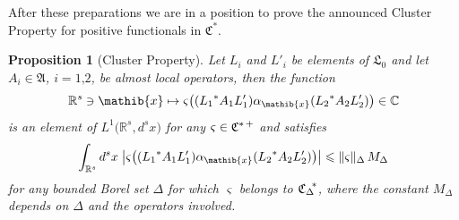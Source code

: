 \documentclass[11pt,twoside,openright]{report}
\theoremstyle{definition}
\theoremstyle{plain}
\newtheorem{Pro}[Def]{Proposition}
\theoremstyle{remark}
\theoremstyle{assumption}
\newcommand{\babs}[1]{\bigl\lvert #1 \bigr\rvert}
\newcommand{\norm}[1]{\lVert #1 \rVert}
\newcommand{\Cbb}{\mathbb{C}}
\newcommand{\Afrak}{\mathfrak{A}}
\newcommand{\Lfrak}{\mathfrak{L}}
\newcommand{\xib}{\mathib{x}}
\newcommand{\Rs}{\mathbb{R}^s}
\newcommand{\Cstar}{\mathfrak{C}^*}
\newcommand{\Cstarplus}{\mathfrak{C}^{* \thinspace +}}
\newcommand{\CDstar}{{\mathfrak{C}_\Delta}^{\negthickspace *}}
\newcommand{\aibx}{\alpha_\mathib{x}}
\begin{document}
After these preparations we are in a position to prove the announced
Cluster Property for positive functionals in $\Cstar$.
\begin{Pro}[Cluster Property]
  \label{Pro-cluster}
  Let $L_i$ and $L'_i$ be elements of $\Lfrak_0$ and let $A_i \in
  \Afrak$, $i = 1 \text{,} 2$, be almost local operators, then the
  function
  \begin{equation*}
    \Rs \ni \xib \mapsto \varsigma \bigl( ( {L_1}^* A_1 L'_1 ) \aibx (
    {L_2}^* A_2 L'_2 ) \bigr) \in \Cbb
  \end{equation*}
  is an element of $L^1 \bigl( \Rs , d^s x \bigr)$ for any $\varsigma
  \in \Cstarplus$ and satisfies
  \begin{equation}
    \label{eq-cluster}
    \int_{\Rs} d^s x \; \babs{\varsigma \bigl( ( {L_1}^* A_1 L'_1 )
    \aibx ( {L_2}^* A_2 L'_2 ) \bigr)} \leqslant
    \norm{\varsigma}_\Delta \, M_\Delta
  \end{equation}
  for any bounded Borel set $\Delta$ for which $\varsigma$ belongs to
  $\CDstar$, where the constant $M_\Delta$ depends on $\Delta$ and the
  operators involved.
\end{Pro}
\end{document}
